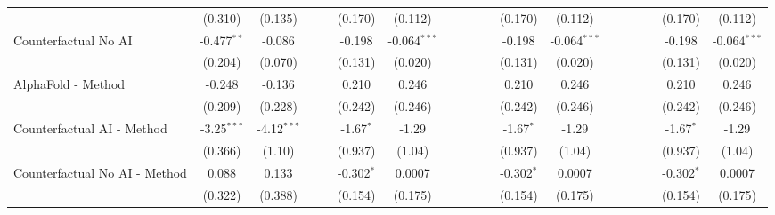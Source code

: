\begin{tabular}{lcccccccccccccccccc}
                                                              & (0.310)       & (0.135)       &     &     & (0.170)      & (0.112)        &       &       &     &      & (0.170)      & (0.112)        &       &       &      &      & (0.170)      & (0.112)\\   
   Counterfactual No AI                                       & -0.477$^{**}$ & -0.086        &     &     & -0.198       & -0.064$^{***}$ &       &       &     &      & -0.198       & -0.064$^{***}$ &       &       &      &      & -0.198       & -0.064$^{***}$\\   
                                                              & (0.204)       & (0.070)       &     &     & (0.131)      & (0.020)        &       &       &     &      & (0.131)      & (0.020)        &       &       &      &      & (0.131)      & (0.020)\\   
   AlphaFold - Method                                         & -0.248        & -0.136        &     &     & 0.210        & 0.246          &       &       &     &      & 0.210        & 0.246          &       &       &      &      & 0.210        & 0.246\\   
                                                              & (0.209)       & (0.228)       &     &     & (0.242)      & (0.246)        &       &       &     &      & (0.242)      & (0.246)        &       &       &      &      & (0.242)      & (0.246)\\   
   Counterfactual AI - Method                                 & -3.25$^{***}$ & -4.12$^{***}$ &     &     & -1.67$^{*}$  & -1.29          &       &       &     &      & -1.67$^{*}$  & -1.29          &       &       &      &      & -1.67$^{*}$  & -1.29\\   
                                                              & (0.366)       & (1.10)        &     &     & (0.937)      & (1.04)         &       &       &     &      & (0.937)      & (1.04)         &       &       &      &      & (0.937)      & (1.04)\\   
   Counterfactual No AI - Method                              & 0.088         & 0.133         &     &     & -0.302$^{*}$ & 0.0007         &       &       &     &      & -0.302$^{*}$ & 0.0007         &       &       &      &      & -0.302$^{*}$ & 0.0007\\   
                                                              & (0.322)       & (0.388)       &     &     & (0.154)      & (0.175)        &       &       &     &      & (0.154)      & (0.175)        &       &       &      &      & (0.154)      & (0.175)\\   

\end{tabular}

